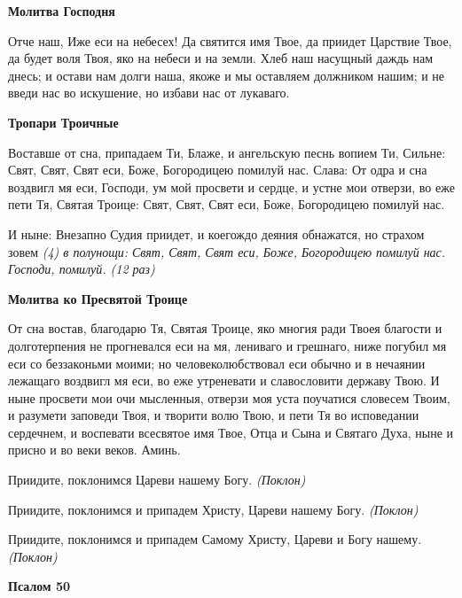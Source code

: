 \medskip
\bfseries Молитва Господня\normalfont{}


Отче наш, Иже еси на небесех! Да святится имя Твое, да приидет Царствие Твое, да будет воля Твоя, яко на небеси и на земли. Хлеб наш насущный даждь нам днесь; и остави нам долги наша, якоже и мы оставляем должником нашим; и не введи нас во искушение, но избави нас от лукаваго.




\medskip
\bfseries Тропари Троичные\normalfont{}


Воставше от сна, припадаем Ти, Блаже, и ангельскую песнь вопием Ти, Сильне: Свят, Свят, Свят еси, Боже, Богородицею помилуй нас.
Слава: От одра и сна воздвигл мя еси, Господи, ум мой просвети и сердце, и устне мои отверзи, во еже пети Тя, Святая Троице: Свят, Свят, Свят еси, Боже, Богородицею помилуй нас. 



И ныне: Внезапно Судия приидет, и коегождо деяния обнажатся, но страхом зовем \itshape (4)\normalfont{} в полунощи: Свят, Свят, Свят еси, Боже, Богородицею помилуй нас.
Господи, помилуй. \itshape (12 раз)\normalfont{}


\medskip
\bfseries Молитва ко Пресвятой Троице\normalfont{}


От сна востав, благодарю Тя, Святая Троице, яко многия ради Твоея благости и долготерпения не прогневался еси на мя, лениваго и грешнаго, ниже погубил мя еси со беззаконьми моими; но человеколюбствовал еси обычно и в нечаянии лежащаго воздвигл мя еси, во еже утреневати и славословити державу Твою. И ныне просвети мои очи мысленныя, отверзи моя уста поучатися словесем Твоим, и разумети заповеди Твоя, и творити волю Твою, и пети Тя во исповедании сердечнем, и воспевати всесвятое имя Твое, Отца и Сына и Святаго Духа, ныне и присно и во веки веков. Аминь.


Приидите, поклонимся Цареви нашему Богу. \itshape (Поклон)\normalfont{}


Приидите, поклонимся и припадем Христу, Цареви нашему Богу. \itshape (Поклон)\normalfont{} 


Приидите, поклонимся и припадем Самому Христу, Цареви и Богу нашему. \itshape (Поклон)\normalfont{}


\medskip
\bfseries Псалом 50\normalfont{}


